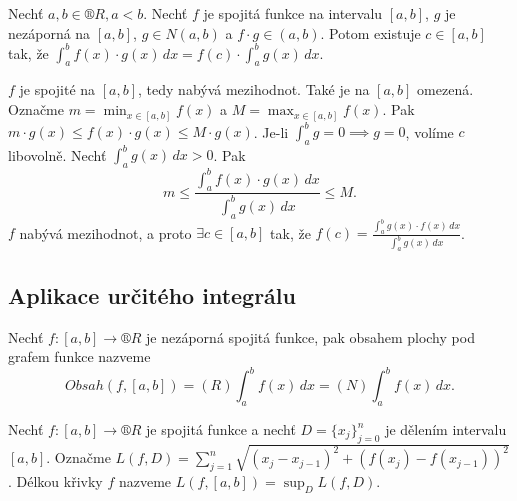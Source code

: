 \documentclass[12pt]{article}                   %
\begin{document}

        \begin{veta}
            Nechť $a, b \in ®R, a < b$. Nechť $f$ je spojitá funkce na intervalu $[a, b]$, $g$ je nezáporná na $[a, b]$, $g \in N(a, b)$ a $f·g \in (a, b)$. Potom existuje $c \in [a, b]$ tak, že $\int_a^b f(x)·g(x)\,dx = f(c)·\int_a^b g(x)\,dx$.

            \begin{dukazin}
                $f$ je spojité na $[a, b]$, tedy nabývá mezihodnot. Také je na $[a, b]$ omezená. Označme $m = \min_{x \in [a, b]}f(x)$ a $M = \max_{x \in [a, b]}f(x)$. Pak $m·g(x) ≤ f(x)·g(x) ≤ M·g(x)$. Je-li $\int_a^b g = 0 \implies g = 0$, volíme $c$ libovolně. Nechť $\int_a^b g(x)\,dx > 0$. Pak
                $$ m ≤ \frac{\int_a^b f(x)·g(x)\,dx}{\int_a^b g(x)\,dx} ≤ M. $$ 
                $f$ nabývá mezihodnot, a proto $\exists c \in [a, b]$ tak, že $f(c) = \frac{\int_a^b g(x)·f(x)\,dx}{\int_a^b g(x)\,dx}$.
            \end{dukazin}
        \end{veta}

    \subsection{Aplikace určitého integrálu}
        \begin{definice}[Obsah]
            Nechť $f: [a, b] \rightarrow ®R$ je nezáporná spojitá funkce, pak obsahem plochy pod grafem funkce nazveme
            $$ Obsah(f, [a, b]) = (R) \int_a^b f(x)\,dx = (N) \int_a^b f(x)\,dx. $$ 
        \end{definice}

        \begin{definice}
            Nechť $f: [a, b] \rightarrow ®R$ je spojitá funkce a nechť $D = \{x_j\}^n_{j=0}$ je dělením intervalu $[a, b]$. Označme $L(f, D) = \sum_{j=1}^n \sqrt{(x_j - x_{j-1})^2 + (f(x_j) - f(x_{j-1}))^2}$. Délkou křivky $f$ nazveme $L(f, [a, b]) = \sup_D L(f, D)$.
        \end{definice}
\end{document}
